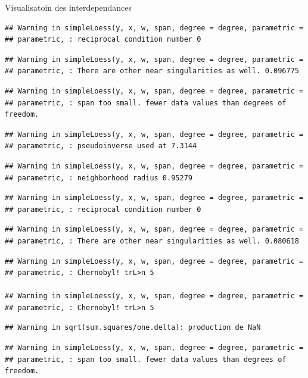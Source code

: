 \documentclass[11pt,ignorenonframetext,]{beamer}
\begin{document}
\begin{frame}[fragile]{Visualisatoin des interdependances}
\begin{verbatim}
## Warning in simpleLoess(y, x, w, span, degree = degree, parametric =
## parametric, : reciprocal condition number 0
\end{verbatim}

\begin{verbatim}
## Warning in simpleLoess(y, x, w, span, degree = degree, parametric =
## parametric, : There are other near singularities as well. 0.096775
\end{verbatim}

\begin{verbatim}
## Warning in simpleLoess(y, x, w, span, degree = degree, parametric =
## parametric, : span too small. fewer data values than degrees of freedom.
\end{verbatim}

\begin{verbatim}
## Warning in simpleLoess(y, x, w, span, degree = degree, parametric =
## parametric, : pseudoinverse used at 7.3144
\end{verbatim}

\begin{verbatim}
## Warning in simpleLoess(y, x, w, span, degree = degree, parametric =
## parametric, : neighborhood radius 0.95279
\end{verbatim}

\begin{verbatim}
## Warning in simpleLoess(y, x, w, span, degree = degree, parametric =
## parametric, : reciprocal condition number 0
\end{verbatim}

\begin{verbatim}
## Warning in simpleLoess(y, x, w, span, degree = degree, parametric =
## parametric, : There are other near singularities as well. 0.080618
\end{verbatim}

\begin{verbatim}
## Warning in simpleLoess(y, x, w, span, degree = degree, parametric =
## parametric, : Chernobyl! trL>n 5

## Warning in simpleLoess(y, x, w, span, degree = degree, parametric =
## parametric, : Chernobyl! trL>n 5
\end{verbatim}

\begin{verbatim}
## Warning in sqrt(sum.squares/one.delta): production de NaN
\end{verbatim}

\begin{verbatim}
## Warning in simpleLoess(y, x, w, span, degree = degree, parametric =
## parametric, : span too small. fewer data values than degrees of freedom.
\end{verbatim}


\end{frame}
\end{document}
